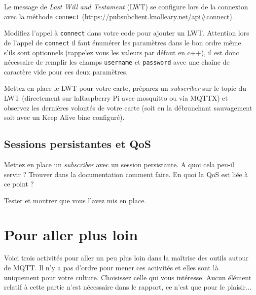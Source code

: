 \documentclass[11pt]{paper}
\newcommand\rasp{Raspberry Pi\xspace}
\newcommand\sub{{\it subscriber}\xspace}
\begin{document}
Le message de {\it Last Will and Testament} (LWT) se configure lors de la connexion avec la méthode {\tt connect} (\url{https://pubsubclient.knolleary.net/api#connect}).

Modifiez l'appel à {\tt connect} dans votre code pour ajouter un LWT. Attention lors de l'appel de {\tt connect} il faut énumérer les paramètres dans le bon ordre même s'ils sont optionnels (rappelez vous les valeurs par défaut en c++), il est donc nécessaire de remplir les champs {\tt username} et {\tt password} avec une chaîne de caractère vide pour ces deux paramètres.

Mettez en place le LWT pour votre carte, préparez un \sub sur le topic du LWT (directement sur la\rasp avec mosquitto ou via MQTTX) et observez les dernières volontés de votre carte (soit en la débranchant sauvagement soit avec un Keep Alive bine configuré).\\


\subsection{Sessions persistantes et QoS}



Mettez en place un \sub avec un session persistante. A quoi cela peu-il servir ? Trouver dans la documentation comment faire. En quoi la QoS est liée à ce point ?

Tester et montrer que vous l'avez mis en place.\\


\section{Pour aller plus loin}

Voici trois activités pour aller un peu plus loin dans la maîtrise des outils autour de MQTT. Il n'y a pas d'ordre pour mener ces activités et elles sont là uniquement pour votre culture. Choisissez celle qui vous intéresse. Aucun élément relatif à cette partie n'est nécessaire dans le rapport, ce n'est que pour le plaisir...
\end{document}
